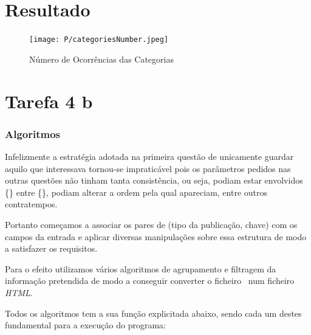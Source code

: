 \documentclass[11pt,a4paper]{report}
\begin{document}
\section{Resultado}

\begin{figure}[h]
\centering
\texttt{[image: P/categoriesNumber.jpeg]}
\caption{Número de Ocorrências das Categorias}
\end{figure}
\newpage
\section{Tarefa 4 b}

\subsubsection{Algoritmos}

Infelizmente a estratégia adotada na primeira questão de unicamente guardar aquilo que interessava tornou-se impraticável pois os parâmetros pedidos nas outras questões não tinham tanta consistência, ou seja, podiam estar envolvidos \{\} entre \{\}, podiam alterar a ordem pela qual apareciam, entre outros contratempos.

Portanto começamos a associar os pares de (tipo da publicação, chave) com os campos da entrada e aplicar diversas manipulações sobre essa estrutura de modo a satisfazer os requisitos.

Para o efeito utilizamos vários algoritmos de agrupamento e filtragem da informação pretendida de modo a conseguir converter o ficheiro \bib\ num ficheiro \emph{HTML}.

Todos os algoritmos tem a sua função explicitada abaixo, sendo cada um destes fundamental para a execução do programa:
\end{document}
